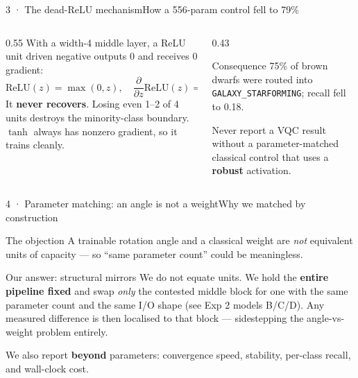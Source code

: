 \begin{frame}{3 · The dead-ReLU mechanism}{How a 556-param control fell to 79\%}
    \begin{columns}[T]
        \begin{column}{0.55\textwidth}
            With a width-4 middle layer, a ReLU unit driven negative outputs $0$ and
            receives $0$ gradient:
            \[
                \mathrm{ReLU}(z)=\max(0,z),\quad
                \frac{\partial}{\partial z}\mathrm{ReLU}(z)=0 \;\text{for}\; z<0 .
            \]
            It \textbf{never recovers}. Losing even 1--2 of 4 units destroys the
            minority-class boundary. $\tanh$ always has nonzero gradient, so it trains
            cleanly.
        \end{column}
        \begin{column}{0.43\textwidth}
            \begin{alertblock}{Consequence}
                75\% of brown dwarfs were routed into \texttt{GALAXY\_STARFORMING};
                recall fell to 0.18.
            \end{alertblock}
            \begin{callout}
                Never report a VQC result without a parameter-matched classical
                control that uses a \textbf{robust} activation.
            \end{callout}
        \end{column}
    \end{columns}
\end{frame}

\begin{frame}{4 · Parameter matching: an angle is not a weight}{Why we matched by construction}
    \begin{block}{The objection}
        A trainable rotation angle and a classical weight are \emph{not} equivalent
        units of capacity --- so ``same parameter count'' could be meaningless.
    \end{block}
    \begin{block}{Our answer: structural mirrors}
        We do not equate units. We hold the \textbf{entire pipeline fixed} and swap
        \emph{only} the contested middle block for one with the same parameter count
        and the same I/O shape (see Exp 2 models B/C/D). Any measured difference is
        then localised to that block --- sidestepping the angle-vs-weight problem
        entirely.
    \end{block}
    \begin{callout}
        We also report \textbf{beyond} parameters: convergence speed, stability,
        per-class recall, and wall-clock cost.
    \end{callout}
\end{frame}

